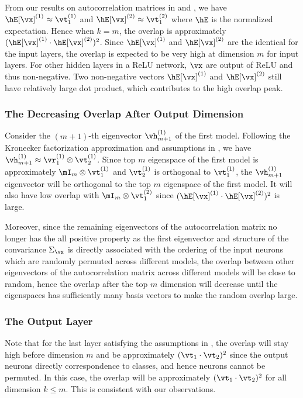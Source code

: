 From our results on autocorrelation matrices in  and , we have $\hE[\vx]^{(1)}\approx \vt^{(1)}_1$ and $\hE[\vx]^{(2)}\approx \vt^{(2)}_1$ where $\hE$ is the normalized expectation. Hence when $k=m$, the overlap is approximately $(\hE[\vx]^{(1)} \cdot \hE[\vx]^{(2)})^2$. Since $\hE[\vx]^{(1)}$ and $\hE[\vx]^{(2)}$ are the identical for the input layers, the overlap is expected to be very high at dimension $m$ for input layers. For other hidden layers in a ReLU network, $\vx$ are output of ReLU and thus non-negative. Two non-negative vectors $\hE[\vx]^{(1)}$ and $\hE[\vx]^{(2)}$ still have relatively large dot product, which contributes to the high overlap peak.

\subsubsection{The Decreasing Overlap After Output Dimension}
\label{sec:app_ovlp_dec}
Consider the $(m+1)$-th eigenvector $\vh^{(1)}_{m+1}$ of the first model. Following the Kronecker factorization approximation and assumptions in , we have $\vh^{(1)}_{m+1}\approx \vr^{(1)}_1\otimes \vt^{(1)}_2$. Since top $m$ eigenspace of the first model is approximately $\mI_m \otimes \vt^{(1)}_1$ and $\vt^{(1)}_2$ is orthogonal to $\vt^{(1)}_1$, the $\vh^{(1)}_{m+1}$ eigenvector will be orthogonal to the top $m$ eigenspace of the first model. It will also have low overlap with $\mI_m \otimes \vt^{(2)}_1$ since $(\hE[\vx]^{(1)} \cdot \hE[\vx]^{(2)})^2$ is large.

Moreover, since the remaining eigenvectors of the autocorrelation matrix no longer has the all positive property as the first eigenvector and structure of the convariance $\Sigma_\vx$ is directly associated with the ordering of the input neurons which are randomly permuted across different models, the overlap between other eigenvectors of the autocorrelation matrix across different models will be close to random, hence the overlap after the top $m$ dimension will decrease until the eigenspaces has sufficiently many basis vectors to make the random overlap large.

\subsubsection{The Output Layer}
Note that for the last layer satisfying the assumptions in , the overlap will stay high before dimension $m$ and be approximately $(\vt_1 \cdot \vt_2)^2$ since the output neurons directly correspondence to classes, and hence neurons cannot be permuted.
In this case, the overlap will be approximately $(\vt_1 \cdot \vt_2)^2$ for all dimension $k\leq m$. This is consistent with our observations.

